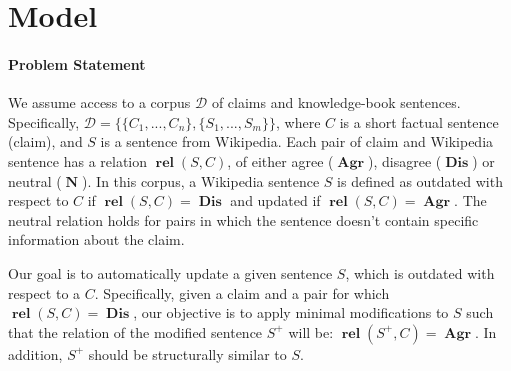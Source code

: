 \documentclass[letterpaper]{article} %
\DeclareMathOperator{\rel}{\boldsymbol{rel}}
\DeclareMathOperator{\A}{\boldsymbol{Agr}}
\DeclareMathOperator{\D}{\boldsymbol{Dis}}
\DeclareMathOperator{\N}{\boldsymbol{N}}
\begin{document}




\section{Model}
\paragraph{Problem Statement}
\label{sec:prob_state}

We assume access to a corpus $\mathcal{D}$ of claims and knowledge-book sentences. Specifically, $\mathcal{D} = \{\{C_1 ,..., C_n\}, \{S_1, ..., S_m\}\}$, where $C$ is a short factual sentence (claim), and $S$ is a sentence from Wikipedia. Each pair of claim and Wikipedia sentence has a relation $\rel(S, C)$, of either agree ($\A$), disagree ($\D$) or neutral ($\N$). In this corpus, a Wikipedia sentence $S$ is defined as outdated with respect to $C$ if $\rel(S,C)=\D$ and updated if $\rel(S,C)=\A$. The neutral relation holds for pairs in which the sentence doesn't contain specific information about the claim.


Our goal is to automatically update a given sentence $S$, which is outdated with respect to a $C$. Specifically, given a claim and a pair for which $\rel(S, C) = \D$, our objective is to apply minimal modifications to $S$ such that the relation of the modified sentence $S^+$ will be: $\rel(S^+, C) = \A$. In addition, $S^+$ should be structurally similar to $S$.
\end{document}
